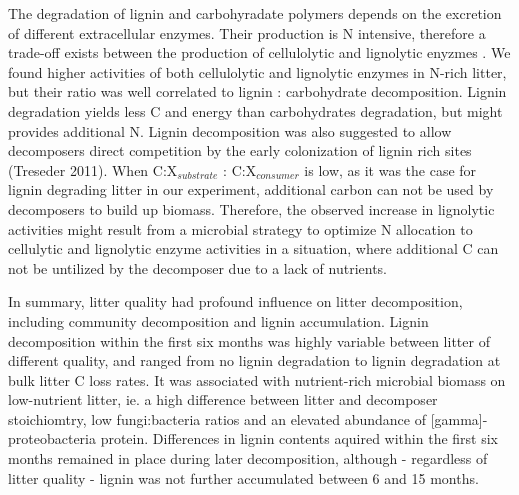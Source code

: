 The degradation of lignin and carbohyradate polymers depends on the excretion of different extracellular enzymes. Their production is N intensive, therefore a trade-off exists between the production of cellulolytic and lignolytic enyzmes \cite{Sinsabaugh2010}. We found higher activities of both cellulolytic and lignolytic enzymes in N-rich litter, but their ratio was well correlated to lignin : carbohydrate decomposition. Lignin degradation yields less C and energy than carbohydrates degradation, but might provides additional N. Lignin decomposition was also suggested to allow decomposers direct competition by the early colonization of lignin rich sites (Treseder 2011). When C:X$_{substrate}$ : C:X$_{consumer}$ is low, as it was the case for lignin degrading litter in our experiment, additional carbon can not be used by decomposers to build up biomass. Therefore, the observed increase in lignolytic activities might result from a microbial strategy to optimize N allocation to cellulytic and lignolytic enzyme activities in a situation, where additional C can not be untilized by the decomposer due to a lack of nutrients. 

In summary, litter quality had profound influence on litter decomposition, including community decomposition and  lignin accumulation. Lignin decomposition within the first six months was highly variable between litter of different quality, and ranged from no lignin degradation to lignin degradation at bulk litter C loss rates. It was associated with nutrient-rich microbial biomass on low-nutrient litter, ie. a high difference between litter and decomposer stoichiomtry, low fungi:bacteria ratios and an elevated abundance of [gamma]-proteobacteria protein. Differences in lignin contents aquired within the first six months remained in place during later decomposition, although - regardless of litter quality - lignin was not further accumulated between 6 and 15 months.